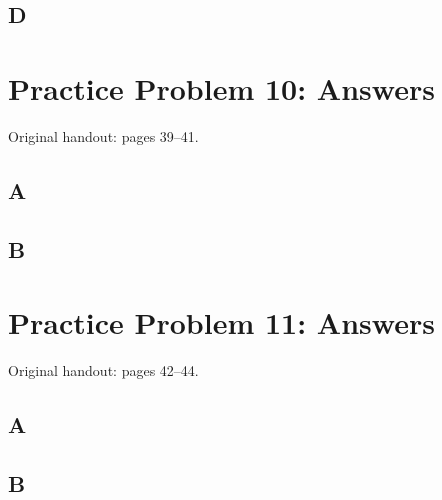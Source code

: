 \documentclass[letterpaper,12pt]{article}
\newcommand{\handout}[1]{%
  
}
\newenvironment{answer}{\par}{\par\medskip}
\begin{document}
\subsection*{D}
\begin{answer}
  \vspace{2cm}
\end{answer}

\clearpage

\handout{39-41}
\section*{Practice Problem 10: Answers}
\noindent Original handout: pages 39--41.\par

\subsection*{A}
\begin{answer}
  \vspace{2cm}
\end{answer}

\subsection*{B}
\begin{answer}
  \vspace{2cm}
\end{answer}

\clearpage

\handout{42-44}
\section*{Practice Problem 11: Answers}
\noindent Original handout: pages 42--44.\par

\subsection*{A}
\begin{answer}
  \vspace{2cm}
\end{answer}

\subsection*{B}
\begin{answer}
  \vspace{2cm}
\end{answer}
\end{document}
